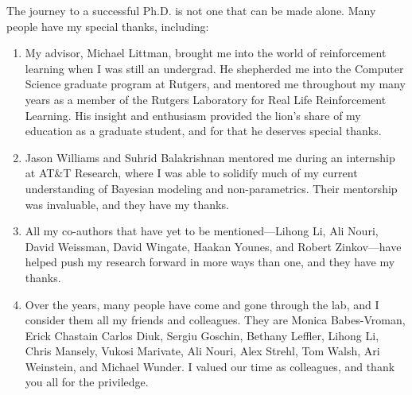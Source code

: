 The journey to a successful Ph.D. is not one that can be made alone. Many people have my special thanks, including:

\begin{enumerate}
\item
My advisor, Michael Littman, brought me into the world of reinforcement learning when I was still an undergrad. He shepherded me into the Computer Science graduate program at Rutgers, and mentored me throughout my many years as a member of the Rutgers Laboratory for Real Life Reinforcement Learning. His insight and enthusiasm provided the lion's share of my education as a graduate student, and for that he deserves special thanks.

\item
Jason Williams and Suhrid Balakrishnan mentored me during an internship at AT\&T Research, where I was able to solidify much of my current understanding of Bayesian modeling and non-parametrics. Their mentorship was invaluable, and they have my thanks.

\item
All my co-authors that have yet to be mentioned---Lihong Li, Ali Nouri, David Weissman, David Wingate, Haakan Younes, and Robert Zinkov---have helped push my research forward in more ways than one, and they have my thanks.

\item
Over the years, many people have come and gone through the lab, and I consider them all my friends and colleagues. They are
Monica Babes-Vroman,
Erick Chastain
Carlos Diuk,
Sergiu Goschin,
Bethany Leffler,
Lihong Li,
Chris Mansely,
Vukosi Marivate,
Ali Nouri,
Alex Strehl,
Tom Walsh,
Ari Weinstein,
and
Michael Wunder.
I valued our time as colleagues, and thank you all for the priviledge.

\end{enumerate}